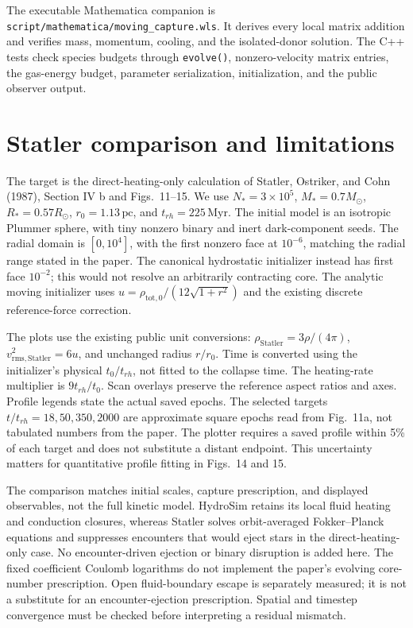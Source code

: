 \documentclass[11pt]{article}
\begin{document}
The executable Mathematica companion is
\texttt{script/mathematica/moving\_capture.wls}. It derives every local matrix
addition and verifies mass, momentum, cooling, and the isolated-donor solution.
The C++ tests check species budgets through \texttt{evolve()}, nonzero-velocity
matrix entries, the gas-energy budget, parameter serialization, initialization,
and the public observer output.

\section{Statler comparison and limitations}
The target is the direct-heating-only calculation of Statler, Ostriker, and
Cohn (1987), Section IV b and Figs.~11--15. We use $N_*=3\times10^5$,
$M_*=0.7M_\odot$, $R_*=0.57R_\odot$, $r_0=1.13\,\mathrm{pc}$, and
$t_{rh}=225\,\mathrm{Myr}$. The initial model is an isotropic Plummer sphere,
with tiny nonzero binary and inert dark-component seeds. The radial domain
is $[0,10^4]$, with the first nonzero face at $10^{-6}$, matching the radial
range stated in the paper. The canonical hydrostatic initializer instead has
first face $10^{-2}$; this would not resolve an arbitrarily contracting core.
The analytic moving initializer uses $u=\rho_{\mathrm{tot},0}/(12\sqrt{1+r^2})$
and the existing discrete reference-force correction.

The plots use the existing public unit conversions:
$\rho_{\mathrm{Statler}}=3\rho/(4\pi)$,
$v_{\mathrm{rms,Statler}}^2=6u$, and unchanged radius $r/r_0$.
Time is converted using the initializer's physical $t_0/t_{rh}$, not fitted
to the collapse time. The heating-rate multiplier is $9t_{rh}/t_0$.
Scan overlays preserve the reference aspect ratios and axes. Profile legends
state the actual saved epochs. The selected targets $t/t_{rh}=18,50,350,2000$
are approximate square epochs read from Fig.~11a, not tabulated numbers from
the paper. The plotter requires a saved profile within 5\% of each target
and does not substitute a distant endpoint. This uncertainty matters for
quantitative profile fitting in Figs.~14 and 15.

The comparison matches initial scales, capture prescription, and displayed
observables, not the full kinetic model. HydroSim retains its local fluid
heating and conduction closures, whereas Statler solves orbit-averaged
Fokker--Planck equations and suppresses encounters that would eject stars in
the direct-heating-only case. No encounter-driven ejection or binary
disruption is added here. The fixed coefficient Coulomb logarithms do not
implement the paper's evolving core-number prescription.
Open fluid-boundary escape is separately measured;
it is not a substitute for an encounter-ejection prescription. Spatial and
timestep convergence must be checked before interpreting a residual mismatch.
\end{document}
